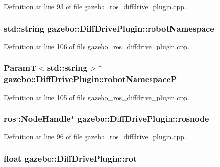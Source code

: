 Definition at line 93 of file gazebo\_\-ros\_\-diffdrive\_\-plugin.cpp.

\subsubsection[{robotNamespace}]{\setlength{\rightskip}{0pt plus 5cm}std::string {\bf gazebo::DiffDrivePlugin::robotNamespace}\hspace{0.3cm}{\ttfamily  [private]}}\label{classgazebo_1_1DiffDrivePlugin_ac2bb267616db23fc332f621c17ee6867}


Definition at line 106 of file gazebo\_\-ros\_\-diffdrive\_\-plugin.cpp.

\subsubsection[{robotNamespaceP}]{\setlength{\rightskip}{0pt plus 5cm}ParamT$<$std::string$>$$\ast$ {\bf gazebo::DiffDrivePlugin::robotNamespaceP}\hspace{0.3cm}{\ttfamily  [private]}}\label{classgazebo_1_1DiffDrivePlugin_ad17a6252d9dddbb82e63e22af1b0abb2}


Definition at line 105 of file gazebo\_\-ros\_\-diffdrive\_\-plugin.cpp.

\subsubsection[{rosnode\_\-}]{\setlength{\rightskip}{0pt plus 5cm}ros::NodeHandle$\ast$ {\bf gazebo::DiffDrivePlugin::rosnode\_\-}\hspace{0.3cm}{\ttfamily  [private]}}\label{classgazebo_1_1DiffDrivePlugin_a3f95546ce1d727b092e065ad363c66a1}


Definition at line 96 of file gazebo\_\-ros\_\-diffdrive\_\-plugin.cpp.

\subsubsection[{rot\_\-}]{\setlength{\rightskip}{0pt plus 5cm}float {\bf gazebo::DiffDrivePlugin::rot\_\-}\hspace{0.3cm}{\ttfamily  [private]}}\label{classgazebo_1_1DiffDrivePlugin_adb1a1a181fda6e8bd94c8924cc62269c}


